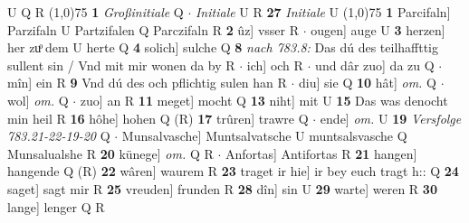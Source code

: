 \documentclass[8pt,a4paper,notitlepage]{article}
\begin{document}
\begin{table}[ht]
\begin{minipage}[t]{0.5\linewidth}
U Q R \newline
\line(1,0){75} \newline
\textbf{1} \textit{Großinitiale} Q   $\cdot$ \textit{Initiale} U R  \textbf{27} \textit{Initiale} U  \newline
\line(1,0){75} \newline
\textbf{1} Parcifaln] Parzifaln U Partzifalen Q Parczifaln R \textbf{2} ûz] vsser R  $\cdot$ ougen] auge U \textbf{3} herzen] her zuͦ dem U herte Q \textbf{4} solich] sulche Q \textbf{8} \textit{nach 783.8:} Das dú des teilhaffttig sullent sin / Vnd mit mir wonen da by R   $\cdot$ ich] och R  $\cdot$ und dâr zuo] da zu Q  $\cdot$ mîn] ein R \textbf{9} Vnd dú des och pflichtig sulen han R  $\cdot$ diu] sie Q \textbf{10} hât] \textit{om.} Q  $\cdot$ wol] \textit{om.} Q  $\cdot$ zuo] an R \textbf{11} meget] mocht Q \textbf{13} niht] mit U \textbf{15} Das was denocht min heil R \textbf{16} hôhe] hohen Q (R) \textbf{17} trûren] trawre Q  $\cdot$ ende] \textit{om.} U \textbf{19} \textit{Versfolge 783.21-22-19-20} Q   $\cdot$ Munsalvasche] Muntsalvatsche U muntsalsvasche Q Munsalualshe R \textbf{20} künege] \textit{om.} Q R  $\cdot$ Anfortas] Antifortas R \textbf{21} hangen] hangende Q (R) \textbf{22} wâren] waurem R \textbf{23} traget ir hie] ir bey euch tragt h:: Q \textbf{24} saget] sagt mir R \textbf{25} vreuden] frunden R \textbf{28} dîn] sin U \textbf{29} warte] weren R \textbf{30} lange] lenger Q R \newline
\end{minipage}
\end{table}
\end{document}
